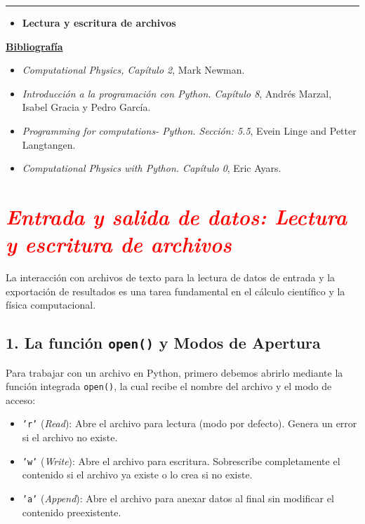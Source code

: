\documentclass[12pt]{article}
\begin{document}
		\thispagestyle{firstpage}
		\vspace*{1.5cm}
	
	\begin{center}
		\rule{\textwidth}{0.4pt}
	\end{center}
	
	\begin{itemize}[leftmargin=*,label=\textcolor{red}{\ensuremath{\blacktriangleright}}]
		\item \textbf{Lectura y escritura de archivos}
	\end{itemize}
	
	\noindent
	\textbf{\underline{Bibliografía}}
	\begin{itemize}[leftmargin=*, label={\textcolor{blue}{$\bullet$}}]
		\item \textit{Computational Physics, Capítulo 2}, Mark Newman.
		\item \textit{Introducción a la programación con Python. Capítulo 8}, Andrés Marzal, Isabel Gracia y Pedro García.
        \item \textit{Programming for computations- Python. Sección: 5.5}, Evein Linge and Petter Langtangen. 
        \item \textit{Computational Physics with Python. Capítulo 0}, Eric Ayars. 
    \end{itemize}
     
\section*{\textcolor{red}{\textit{Entrada y salida de datos: Lectura y escritura de archivos}}}

La interacción con archivos de texto para la lectura de datos de entrada y la 
exportación de resultados es una tarea fundamental en el cálculo científico y la física 
computacional.

\subsection*{1. La función \texttt{open()} y Modos de Apertura}

Para trabajar con un archivo en Python, primero debemos abrirlo mediante la función 
integrada \texttt{open()}, la cual recibe el nombre del archivo y el modo de acceso:

\begin{itemize}
    \item \texttt{'r'} (\textit{Read}): Abre el archivo para lectura (modo por defecto). Genera un error si el archivo no existe.
    \item \texttt{'w'} (\textit{Write}): Abre el archivo para escritura. Sobrescribe completamente el contenido si el archivo ya existe o lo crea si no existe.
    \item \texttt{'a'} (\textit{Append}): Abre el archivo para anexar datos al final sin modificar el contenido preexistente.
\end{itemize}
\end{document}
